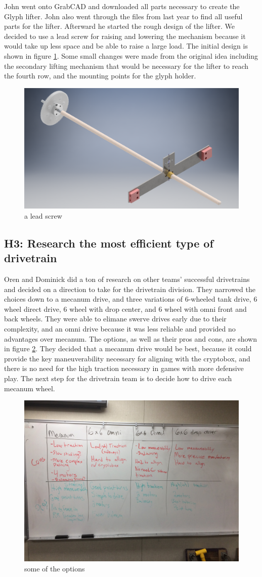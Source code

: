 \documentclass{article}
\begin{document}
John went onto GrabCAD and downloaded all parts necessary to create the Glyph lifter. John also went through the files from last year to find all useful parts for the lifter. Afterward he started the rough design of the lifter. We decided to use a lead screw for raising and lowering the mechanism because it would take up less space and be able to raise a large load. The initial design is shown in figure \ref{fig:leadscrew}. Some small changes were made from the original idea including the secondary lifting mechanism that would be necessary for the lifter to reach the fourth row, and the mounting points for the glyph holder.
\begin{figure}[h]
    \centering
    \includegraphics[width=.6\textwidth]{02/images/leadscrew.png}
    \caption{a lead screw}
    \label{fig:leadscrew}
\end{figure}

\subsection{H3: Research the most efficient type of drivetrain}

Oren and Dominick did a ton of research on other teams' successful drivetrains and decided on a direction to take for the drivetrain division. They narrowed the choices down to a mecanum drive, and three variations of 6-wheeled tank drive, 6 wheel direct drive, 6 wheel with drop center, and 6 wheel with omni front and back wheels. They were able to elimane swerve drives early due to their complexity, and an omni drive because it was less reliable and provided no advantages over mecanum. The options, as well as their pros and cons, are shown in figure \ref{fig:options}. They decided that a mecanum drive would be best, because it could provide the key maneuverability necessary for aligning with the cryptobox, and there is no need for the high traction necessary in games with more defensive play. The next step for the drivetrain team is to decide how to drive each mecanum wheel.
\begin{figure}[h]
    \centering
    \includegraphics[width=.6\textwidth]{02/images/options.jpg}
    \caption{some of the options}
    \label{fig:options}
\end{figure}
\end{document}
